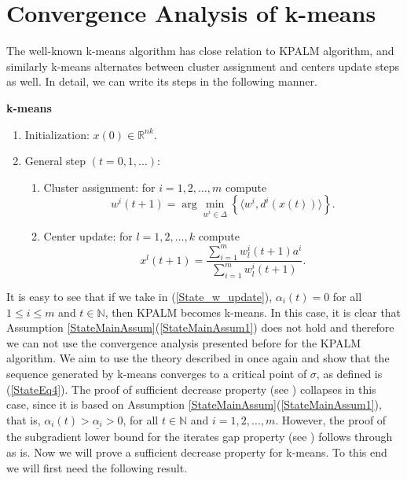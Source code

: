 \section{Convergence Analysis of k-means}

The well-known k-means algorithm has close relation to KPALM algorithm, and similarly k-means alternates between cluster assignment and centers update steps as well. In detail, we can write its steps in the following manner.

\begin{framed}
\noindent \textbf{k-means}
\begin{enumerate}[(1)]
	\item Initialization: $x(0) \in \mathbb{R}^{nk}$.
	\item General step $\left( t=0,1, \ldots \right)$:
	\begin{enumerate}[(2.1)]
		\item Cluster assignment: for $i=1, 2, \ldots ,m$ compute
		\begin{equation}
			w^i(t+1) = \arg\!\min\limits_{w^i \in \Delta} \left\lbrace \langle w^i , d^i(x(t)) \rangle\right\rbrace . \label{StateEq12}
		\end{equation}
		\item Center update: for $l=1, 2, \ldots ,k$ compute
		\begin{equation}
			x^l(t+1) = \frac{\sum_{i=1}^{m} w^i_l(t+1) a^i}{\sum_{i=1}^{m} w^i_l(t+1)} . \label{StateEq13}
		\end{equation}
	\end{enumerate}
\end{enumerate}
\end{framed}

It is easy to see that if we take in (\ref{State_w_update}), $\alpha_i(t) = 0$ for all $1 \leq i \leq m$ and $t \in \mathbb{N}$, then KPALM becomes k-means. In this case, it is clear that Assumption \ref{StateMainAssum}(\ref{StateMainAssum1}) does not hold and therefore we can not use the convergence analysis presented before for the KPALM algorithm. We aim to use the theory described in  once again and show that the sequence generated by k-means converges to a critical point of $\sigma$, as defined is (\ref{StateEq4}). The proof of sufficient decrease property (see ) collapses in this case, since it is based on Assumption \ref{StateMainAssum}(\ref{StateMainAssum1}), that is, $\alpha_i(t) > \underline{\alpha_i} > 0$, for all $t \in \mathbb{N}$ and $i=1,2, \ldots, m$. However, the proof of the subgradient lower bound for the iterates gap property (see ) follows through as is. Now we will prove a sufficient decrease property for k-means. To this end we will first need the following result.

